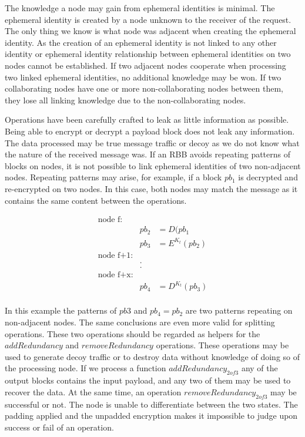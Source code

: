 \documentclass[acmsmall, screen, review]{acmart}
\begin{document}
The knowledge a node may gain from ephemeral identities is minimal. The ephemeral identity is created by a node unknown to the receiver of the request. The only thing we know is what node was adjacent when creating the ephemeral identity. As the creation of an ephemeral identity is not linked to any other identity or ephemeral identity relationship between ephemeral identities on two nodes cannot be established. If two adjacent nodes cooperate when processing two linked ephemeral identities, no additional knowledge may be won. If two collaborating nodes have one or more non-collaborating nodes between them, they lose all linking knowledge due to the non-collaborating nodes. 

Operations have been carefully crafted to leak as little information as possible. Being able to encrypt or decrypt a payload block does not leak any information. The data processed may be true message traffic or decoy as we do not know what the nature of the received message was. If an RBB avoids repeating patterns of blocks on nodes, it is not possible to link ephemeral identities of two non-adjacent nodes. Repeating patterns may arise, for example, if a block $pb_1$ is decrypted and re-encrypted on two nodes. In this case, both nodes may match the message as it contains the same content between the operations.

\begin{eqnarray*}
	\text{node f:}\\
	& pb_2 & = D(pb_1\\
	& pb_3 & = E^{K_t}(pb_2)\\
	\text{node f+1:}\\
	&.\\
	&.\\    
	\text{node f+x:}\\
	& pb_4 & = D^{K_t}(pb_3)\\
\end{eqnarray*}

In this example the patterns of $pb3$ and $pb_4=pb_2$ are two patterns repeating on non-adjacent nodes. The same conclusions are even more valid for splitting operations. These two operations should be regarded as helpers for the $addRedundancy$ and $removeRedundancy$ operations. These operations may be used to generate decoy traffic or to destroy data without knowledge of doing so of the processing node. If we process a function $addRedundancy_{2 of 3}$ any of the output blocks contains the input payload, and any two of them may be used to recover the data. At the same time, an operation $removeRedundancy_{2 of 3}$ may be successful or not. The node is unable to differentiate between the two states. The padding applied and the unpadded encryption makes it impossible to judge upon success or fail of an operation.
\end{document}
